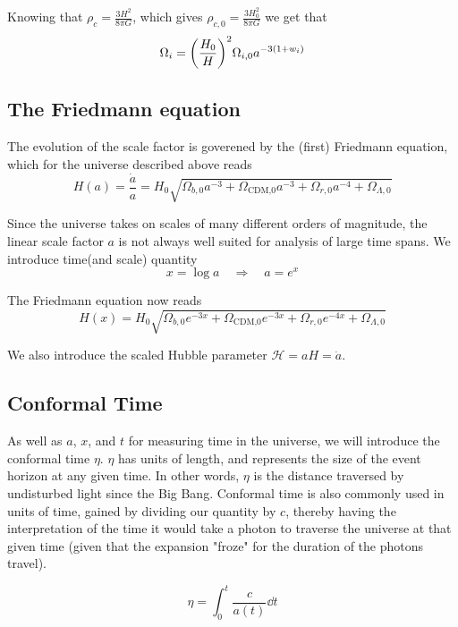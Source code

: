\documentclass[10pt, a4paper]{article}
\renewcommand{\exp}{e^}
\renewcommand{\exp}{e^}
\begin{document}
Knowing that $\rho_c = \frac{3H^2}{8\pi G}$, which gives $\rho_{c,0} = \frac{3H_0^2}{8\pi G}$ we get that
\begin{align}\label{eqn:Omegas}
    \Omega_{i} = \qty(\frac{H_0}{H})^2\Omega_{i,0}a^{-3(1+w_i)}
\end{align}


\subsection{The Friedmann equation}
The evolution of the scale factor is goverened by the (first) Friedmann equation, which for the universe described above reads
\begin{equation}
    H(a) = \frac{\dot{a}}{a} = H_0\sqrt{\Omega_{b,0} a^{-3} + \Omega_\text{{CDM},0}a^{-3} + \Omega_{r,0}a^{-4} + \Omega_{\Lambda,0}}
\end{equation}

Since the universe takes on scales of many different orders of magnitude, the linear scale factor $a$ is not always well suited for analysis of large time spans. We introduce time(and scale) quantity
\begin{equation}
    x = \log{a} \quad \Rightarrow \quad a = \exp{x}
\end{equation}

The Friedmann equation now reads
\begin{equation} \label{eqn:Friedmann}
    H(x) = H_0\sqrt{\Omega_{b,0} e^{-3x} + \Omega_\text{{CDM},0}e^{-3x} + \Omega_{r,0}e^{-4x} + \Omega_{\Lambda,0}}
\end{equation}

We also introduce the scaled Hubble parameter $\mathcal{H} = aH = \dot{a}$.


\subsection{Conformal Time}
As well as $a$, $x$, and $t$ for measuring time in the universe, we will introduce the conformal time $\eta$. $\eta$ has units of length, and represents the size of the event horizon at any given time. In other words, $\eta$ is the distance traversed by undisturbed light since the Big Bang. Conformal time is also commonly used in units of time, gained by dividing our quantity by $c$, thereby having the interpretation of the time it would take a photon to traverse the universe at that given time (given that the expansion "froze" for the duration of the photons travel).

\begin{equation}
    \eta = \int_0^t \frac{c}{a(t)} \dd{t}
\end{equation}
\end{document}

